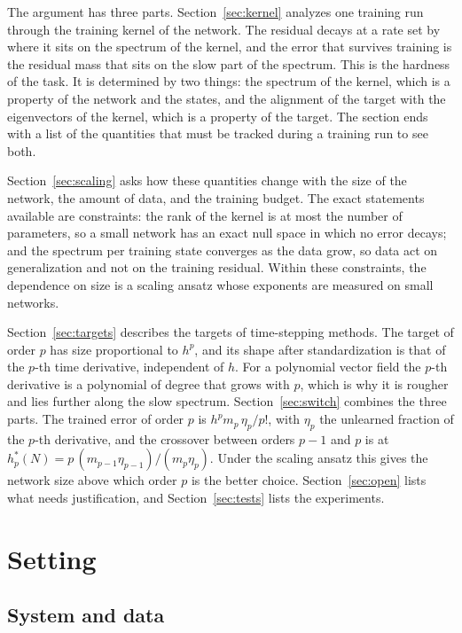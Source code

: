 \documentclass[11pt]{article}
\theoremstyle{definition}
\theoremstyle{remark}
\begin{document}
The argument has three parts.
Section~\ref{sec:kernel} analyzes one training run through the training kernel of the network.
The residual decays at a rate set by where it sits on the spectrum of the kernel, and the error that survives training is the residual mass that sits on the slow part of the spectrum.
This is the hardness of the task.
It is determined by two things: the spectrum of the kernel, which is a property of the network and the states, and the alignment of the target with the eigenvectors of the kernel, which is a property of the target.
The section ends with a list of the quantities that must be tracked during a training run to see both.

Section~\ref{sec:scaling} asks how these quantities change with the size of the network, the amount of data, and the training budget.
The exact statements available are constraints: the rank of the kernel is at most the number of parameters, so a small network has an exact null space in which no error decays; and the spectrum per training state converges as the data grow, so data act on generalization and not on the training residual.
Within these constraints, the dependence on size is a scaling ansatz whose exponents are measured on small networks.

Section~\ref{sec:targets} describes the targets of time-stepping methods.
The target of order $p$ has size proportional to $h^p$, and its shape after standardization is that of the $p$-th time derivative, independent of $h$.
For a polynomial vector field the $p$-th derivative is a polynomial of degree that grows with $p$, which is why it is rougher and lies further along the slow spectrum.
Section~\ref{sec:switch} combines the three parts.
The trained error of order $p$ is $h^p m_p\,\eta_p/p!$, with $\eta_p$ the unlearned fraction of the $p$-th derivative, and the crossover between orders $p-1$ and $p$ is at $h_p^\ast(N) = p\,(m_{p-1}\eta_{p-1})/(m_p\eta_p)$.
Under the scaling ansatz this gives the network size above which order $p$ is the better choice.
Section~\ref{sec:open} lists what needs justification, and Section~\ref{sec:tests} lists the experiments.

\section{Setting}\label{sec:setting}

\subsection{System and data}
\end{document}

